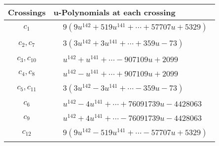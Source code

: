 \documentclass[1p]{elsarticle_modified}
\theoremstyle{definition}
\begin{document}
\begin{tabular}{m{50pt}|m{274pt}}
Crossings & \hspace{64pt}u-Polynomials at each crossing \\
\hline $$\begin{aligned}c_{1}\end{aligned}$$&$\begin{aligned}
&9(9 u^{142}+519 u^{141}+\cdots+57707 u+5329)
\end{aligned}$\\
\hline $$\begin{aligned}c_{2},c_{7}\end{aligned}$$&$\begin{aligned}
&3(3 u^{142}+3 u^{141}+\cdots+359 u-73)
\end{aligned}$\\
\hline $$\begin{aligned}c_{3},c_{10}\end{aligned}$$&$\begin{aligned}
&u^{142}+u^{141}+\cdots-907109 u+2099
\end{aligned}$\\
\hline $$\begin{aligned}c_{4},c_{8}\end{aligned}$$&$\begin{aligned}
&u^{142}- u^{141}+\cdots+907109 u+2099
\end{aligned}$\\
\hline $$\begin{aligned}c_{5},c_{11}\end{aligned}$$&$\begin{aligned}
&3(3 u^{142}-3 u^{141}+\cdots-359 u-73)
\end{aligned}$\\
\hline $$\begin{aligned}c_{6}\end{aligned}$$&$\begin{aligned}
&u^{142}-4 u^{141}+\cdots+76091739 u-4428063
\end{aligned}$\\
\hline $$\begin{aligned}c_{9}\end{aligned}$$&$\begin{aligned}
&u^{142}+4 u^{141}+\cdots-76091739 u-4428063
\end{aligned}$\\
\hline $$\begin{aligned}c_{12}\end{aligned}$$&$\begin{aligned}
&9(9 u^{142}-519 u^{141}+\cdots-57707 u+5329)
\end{aligned}$\\
\hline
\end{tabular}\\~\\
\end{document}
